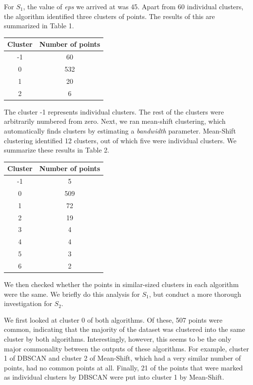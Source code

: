 \documentclass[12pt,a4paper,twocolumn]{article}
\begin{document}
For $S_1$, the value of \textit{eps} we arrived at was 45. Apart from 60 individual clusters, the algorithm identified three clusters of points. The results of this are summarized in Table 1. \\

\begin{tabular}{|c|c|}
\hline 
\textbf{Cluster} & \textbf{Number of points} \\ 
\hline 
-1 & 60 \\ 
\hline 
0 & 532 \\ 
\hline 
1 & 20 \\ 
\hline 
2 & 6 \\ 
\hline 
\end{tabular}
\begingroup
{}
\endgroup
\hfill\break

The cluster -1 represents individual clusters. The rest of the clusters were arbitrarily numbered from zero. Next, we ran mean-shift clustering, which automatically finds clusters by estimating a \textit{bandwidth} parameter. Mean-Shift clustering identified 12 clusters, out of which five were individual clusters. We summarize these results in Table 2.\\

\begin{tabular}{|c|c|}
\hline 
\textbf{Cluster} & \textbf{Number of points} \\ 
\hline 
-1 & 5 \\ 
\hline 
0 & 509 \\ 
\hline 
1 & 72 \\ 
\hline 
2 & 19 \\ 
\hline 
3 & 4 \\ 
\hline 
4 & 4 \\ 
\hline 
5 & 3 \\ 
\hline 
6 & 2 \\ 
\hline 
\end{tabular}
\begingroup
{}
\endgroup
\hfill\break

We then checked whether the points in similar-sized clusters in each algorithm were the same. We briefly do this analysis for $S_1$, but conduct a more thorough investigation for $S_2$.

We first looked at cluster 0 of both algorithms. Of these, 507 points were common, indicating that the majority of the dataset was clustered into the same cluster by both algorithms. Interestingly, however, this seems to be the only major commonality between the outputs of these algorithms. For example, cluster 1 of DBSCAN and cluster 2 of Mean-Shift, which had a very similar number of points, had no common points at all. Finally, 21 of the points that were marked as individual clusters by DBSCAN were put into cluster 1 by Mean-Shift.
\end{document}
